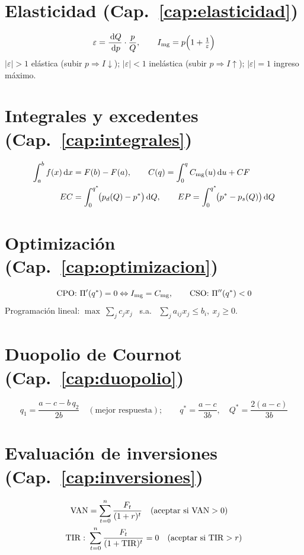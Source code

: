 \section*{Elasticidad (Cap.~\ref{cap:elasticidad})}
\[
\varepsilon = \frac{\,\mathrm{d} Q}{\,\mathrm{d} p}\cdot\frac{p}{Q}, \qquad
I_{\mathrm{mg}} = p\Big(1 + \tfrac{1}{\varepsilon}\Big)
\]
$|\varepsilon|>1$ elástica (subir $p \Rightarrow I\downarrow$); \; $|\varepsilon|<1$ inelástica (subir $p \Rightarrow I\uparrow$); \; $|\varepsilon|=1$ ingreso máximo.

\section*{Integrales y excedentes (Cap.~\ref{cap:integrales})}
\begin{align*}
\int_a^b f(x)\,\mathrm{d} x &= F(b)-F(a), \qquad C(q) = \int_0^q C_{\mathrm{mg}}(u)\,\mathrm{d} u + CF \\
EC &= \int_0^{q^{*}}\!\!\big(p_d(Q)-p^{*}\big)\,\mathrm{d} Q, \qquad
EP = \int_0^{q^{*}}\!\!\big(p^{*}-p_s(Q)\big)\,\mathrm{d} Q
\end{align*}

\section*{Optimización (Cap.~\ref{cap:optimizacion})}
\[
\text{CPO: } \Pi'(q^{*})=0 \Leftrightarrow I_{\mathrm{mg}}=C_{\mathrm{mg}}, \qquad
\text{CSO: } \Pi''(q^{*})<0
\]
Programación lineal: $\max\ \sum_j c_j x_j$ \ s.a. \ $\sum_j a_{ij}x_j \le b_i,\ x_j\ge 0$.

\section*{Duopolio de Cournot (Cap.~\ref{cap:duopolio})}
\[
q_1 = \frac{a - c - b\,q_2}{2b} \quad(\text{mejor respuesta}); \qquad
q^{*} = \frac{a-c}{3b}, \quad Q^{*} = \frac{2(a-c)}{3b}
\]

\section*{Evaluación de inversiones (Cap.~\ref{cap:inversiones})}
\begin{align*}
\mathrm{VAN} &= \sum_{t=0}^{n}\frac{F_t}{(1+r)^{t}} \quad(\text{aceptar si } \mathrm{VAN}>0) \\
\mathrm{TIR}:\ & \sum_{t=0}^{n}\frac{F_t}{(1+\mathrm{TIR})^{t}} = 0 \quad(\text{aceptar si } \mathrm{TIR} > r)
\end{align*}

